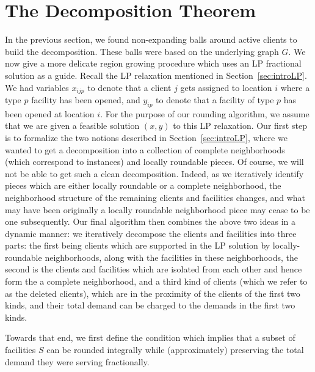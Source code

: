 \newpage
\section{The Decomposition Theorem}
\def\F{F_\mathsf{tentative}}
In the previous section, we found non-expanding balls around active clients to build the decomposition. These balls were based on the underlying graph $G$. We now give a more 
delicate region growing procedure which uses an LP fractional solution as a guide. Recall the LP relaxation mentioned in Section~\ref{sec:introLP}. 
We had variables $x_{ijp}$ to denote that a client $j$ gets assigned to location $i$ where a type $p$ facility has been opened, and $y_{ip}$ to denote that a facility of type $p$ has been opened at location $i$. 
For the purpose of our rounding algorithm, we assume that we are given a feasible solution $(x,y)$ to this LP relaxation. 
Our first step is to formalize the two notions described in Section~\ref{sec:introLP}, where
we wanted to get  a decomposition into a collection of complete neighborhoods (which correspond to \cckp instances)  and locally roundable pieces. 
Of course, we will not be able to get such a clean decomposition. Indeed, as we iteratively identify pieces which are either locally roundable or a 
complete neighborhood, the neighborhood structure of the remaining clients and facilities changes, and what may have been originally a locally roundable neighborhood piece may cease to be one subsequently. Our final algorithm then combines the above two ideas in a dynamic manner: we iteratively decompose the clients and facilities into three parts: the first being clients which are supported in the LP solution by locally-roundable neighborhoods, along with the facilities in these neighborhoods, the second is the clients and facilities which are isolated from each other and hence form the a complete neighborhood, and a third kind of clients (which we refer to as the deleted clients), which are in the proximity of the clients of the first two kinds, and their total demand can be charged to the demands in the first two kinds.


Towards that end, we first define the condition which implies that a subset of facilities $S$ can be rounded integrally while (approximately) preserving the total demand they were serving fractionally.

